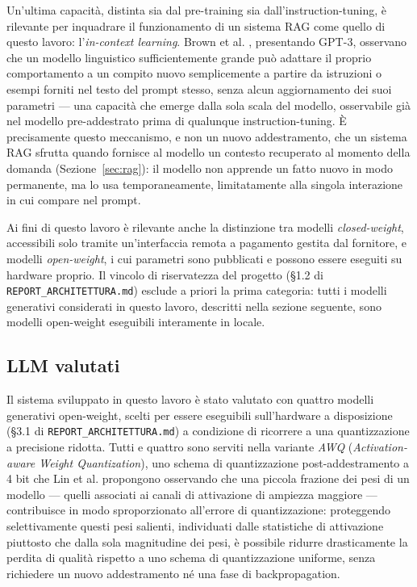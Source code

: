 Un'ultima capacità, distinta sia dal pre-training sia dall'instruction-tuning, è rilevante per inquadrare il
funzionamento di un sistema RAG come quello di questo lavoro: l'\emph{in-context learning}. Brown et al.
\cite{brown2020gpt3}, presentando GPT-3, osservano che un modello linguistico sufficientemente grande può adattare
il proprio comportamento a un compito nuovo semplicemente a partire da istruzioni o esempi forniti nel testo del
prompt stesso, senza alcun aggiornamento dei suoi parametri --- una capacità che emerge dalla sola scala del modello,
osservabile già nel modello pre-addestrato prima di qualunque instruction-tuning. È precisamente questo meccanismo,
e non un nuovo addestramento, che un sistema RAG sfrutta quando fornisce al modello un contesto recuperato al momento
della domanda (Sezione~\ref{sec:rag}): il modello non apprende un fatto nuovo in modo permanente, ma lo usa
temporaneamente, limitatamente alla singola interazione in cui compare nel prompt.

Ai fini di questo lavoro è rilevante anche la distinzione tra modelli \emph{closed-weight}, accessibili solo tramite
un'interfaccia remota a pagamento gestita dal fornitore, e modelli \emph{open-weight}, i cui parametri sono
pubblicati e possono essere eseguiti su hardware proprio. Il vincolo di riservatezza del progetto (§1.2 di
\texttt{REPORT\_ARCHITETTURA.md}) esclude a priori la prima categoria: tutti i modelli generativi considerati in
questo lavoro, descritti nella sezione seguente, sono modelli open-weight eseguibili interamente in locale.

\subsection{LLM valutati}
\label{subsec:llm-valutati}

Il sistema sviluppato in questo lavoro è stato valutato con quattro modelli generativi open-weight, scelti per essere
eseguibili sull'hardware a disposizione (§3.1 di \texttt{REPORT\_ARCHITETTURA.md}) a condizione di ricorrere a una
quantizzazione a precisione ridotta. Tutti e quattro sono serviti nella variante \emph{AWQ} (\emph{Activation-aware
Weight Quantization}), uno schema di quantizzazione post-addestramento a 4 bit che Lin et al. \cite{lin2024awq}
propongono osservando che una piccola frazione dei pesi di un modello --- quelli associati ai canali di attivazione
di ampiezza maggiore --- contribuisce in modo sproporzionato all'errore di quantizzazione: proteggendo selettivamente
questi pesi salienti, individuati dalle statistiche di attivazione piuttosto che dalla sola magnitudine dei pesi, è
possibile ridurre drasticamente la perdita di qualità rispetto a uno schema di quantizzazione uniforme, senza
richiedere un nuovo addestramento né una fase di backpropagation.

